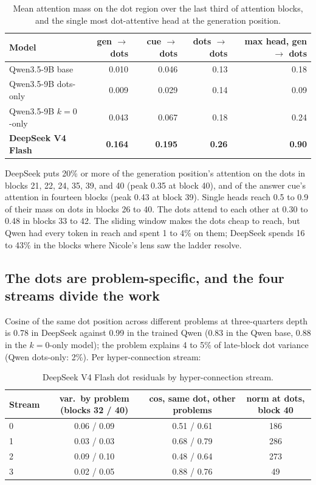 \documentclass[11pt]{article}
\begin{document}
\begin{table}[h]\centering\small
\begin{tabular}{lrrrr}\toprule
Model & gen $\to$ dots & cue $\to$ dots & dots $\to$ dots & max head, gen $\to$ dots \\ \midrule
Qwen3.5-9B base & 0.010 & 0.046 & 0.13 & 0.18 \\
Qwen3.5-9B dots-only & 0.009 & 0.029 & 0.14 & 0.09 \\
Qwen3.5-9B $k=0$-only & 0.043 & 0.067 & 0.18 & 0.24 \\
\textbf{DeepSeek V4 Flash} & \textbf{0.164} & \textbf{0.195} & \textbf{0.26} & \textbf{0.90} \\ \bottomrule
\end{tabular}
\caption{Mean attention mass on the dot region over the last third of attention blocks, and the single most dot-attentive head at the generation position.}\end{table}

DeepSeek puts 20\% or more of the generation position's attention on the dots in blocks 21, 22, 24, 35, 39, and 40 (peak 0.35 at block 40), and of the answer cue's attention in fourteen blocks (peak 0.43 at block 39). Single heads reach 0.5 to 0.9 of their mass on dots in blocks 26 to 40. The dots attend to each other at 0.30 to 0.48 in blocks 33 to 42. The sliding window makes the dots cheap to reach, but Qwen had every token in reach and spent 1 to 4\% on them; DeepSeek spends 16 to 43\% in the blocks where Nicole's lens saw the ladder resolve.

\subsection{The dots are problem-specific, and the four streams divide the work}

Cosine of the same dot position across different problems at three-quarters depth is 0.78 in DeepSeek against 0.99 in the trained Qwen (0.83 in the Qwen base, 0.88 in the $k=0$-only model); the problem explains 4 to 5\% of late-block dot variance (Qwen dots-only: 2\%). Per hyper-connection stream:

\begin{table}[h]\centering\small
\begin{tabular}{lccc}\toprule
Stream & var.\ by problem (blocks 32 / 40) & cos, same dot, other problems & norm at dots, block 40 \\ \midrule
0 & 0.06 / 0.09 & 0.51 / 0.61 & 186 \\
1 & 0.03 / 0.03 & 0.68 / 0.79 & 286 \\
2 & 0.09 / 0.10 & 0.48 / 0.64 & 273 \\
3 & 0.02 / 0.05 & 0.88 / 0.76 & 49 \\ \bottomrule
\end{tabular}
\caption{DeepSeek V4 Flash dot residuals by hyper-connection stream.}\end{table}
\end{document}

